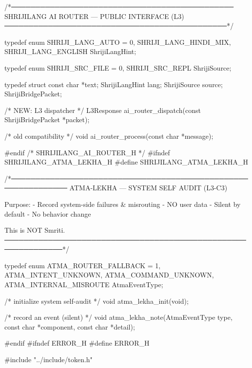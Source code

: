 \documentclass{article}
\begin{document}
/*──────────────────────────────────────────────
  SHRIJILANG AI ROUTER — PUBLIC INTERFACE (L3)
──────────────────────────────────────────────*/

typedef enum {
    SHRIJI_LANG_AUTO = 0,
    SHRIJI_LANG_HINDI_MIX,
    SHRIJI_LANG_ENGLISH
} ShrijiLangHint;

typedef enum {
    SHRIJI_SRC_FILE = 0,
    SHRIJI_SRC_REPL
} ShrijiSource;

typedef struct {
    const char      *text;
    ShrijiLangHint   lang;
    ShrijiSource     source;
} ShrijiBridgePacket;

/* NEW: L3 dispatcher */
L3Response ai_router_dispatch(const ShrijiBridgePacket *packet);

/* old compatibility */
void ai_router_process(const char *message);

#endif /* SHRIJILANG_AI_ROUTER_H */
#ifndef SHRIJILANG_ATMA_LEKHA_H
#define SHRIJILANG_ATMA_LEKHA_H

/*──────────────────────────────────────────────────────────────
  ATMA-LEKHA — SYSTEM SELF AUDIT (L3-C3)

  Purpose:
  - Record system-side failures & misrouting
  - NO user data
  - Silent by default
  - No behavior change

  This is NOT Smriti.
──────────────────────────────────────────────────────────────*/

typedef enum {
    ATMA_ROUTER_FALLBACK = 1,
    ATMA_INTENT_UNKNOWN,
    ATMA_COMMAND_UNKNOWN,
    ATMA_INTERNAL_MISROUTE
} AtmaEventType;

/* initialize system self-audit */
void atma_lekha_init(void);

/* record an event (silent) */
void atma_lekha_note(AtmaEventType type,
                     const char *component,
                     const char *detail);

#endif
#ifndef ERROR_H
#define ERROR_H

#include "../include/token.h"
\end{document}
